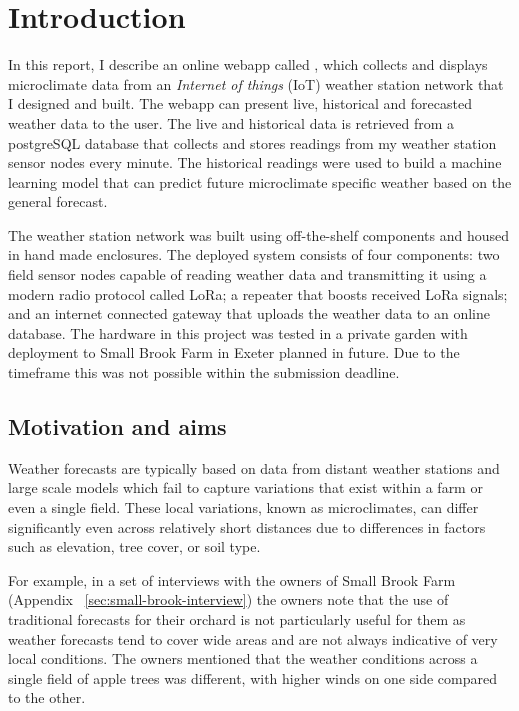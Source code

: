 \section{Introduction}

In this report, I describe an online webapp called \myReportTitle{}, which
collects and displays microclimate data from an \emph{Internet of things} (IoT)
weather station network that I designed and built. The webapp can present live,
historical and forecasted weather data to the user. The live and historical data
is retrieved from a postgreSQL database that collects and stores readings from
my weather station sensor nodes every minute. The historical readings were used
to build a machine learning model that can predict future microclimate specific
weather based on the general forecast.

The weather station network was built using off-the-shelf components and housed
in hand made enclosures. The deployed system consists of four components: two
field sensor nodes capable of reading weather data and transmitting it using a
modern radio protocol called LoRa; a repeater that boosts received LoRa signals;
and an internet connected gateway that uploads the weather data to an online
database. The hardware in this project was tested in a private garden with
deployment to Small Brook Farm in Exeter planned in future. Due to the timeframe
this was not possible within the submission deadline.

\subsection{Motivation and aims}

Weather forecasts are typically based on data from distant weather stations and
large scale models which fail to capture variations that exist within a farm or
even a single field. These local variations, known as microclimates, can differ
significantly even across relatively short distances due to differences in
factors such as elevation, tree cover, or soil type.

For example, in a set of interviews with the owners of Small Brook Farm
(Appendix ~\ref{sec:small-brook-interview}) the owners note that the use of
traditional forecasts for their orchard is not particularly useful for them as
weather forecasts tend to cover wide areas and are not always indicative of very
local conditions. The owners mentioned that the weather conditions across a
single field of apple trees was different, with higher winds on one side
compared to the other.

